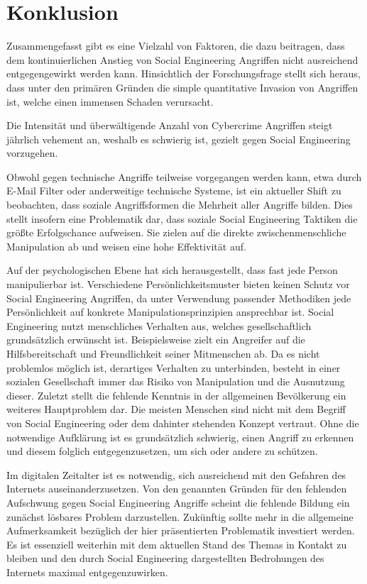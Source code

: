 \chapter{Konklusion}
\label{chapter:konklusion}

Zusammengefasst gibt es eine Vielzahl von Faktoren, die dazu beitragen, dass dem kontinuierlichen Anstieg von Social Engineering Angriffen nicht ausreichend entgegengewirkt werden kann.
Hinsichtlich der Forschungsfrage stellt sich heraus, dass unter den primären Gründen die simple quantitative Invasion von Angriffen ist, welche einen immensen Schaden verursacht.

Die Intensität und überwältigende Anzahl von Cybercrime Angriffen steigt jährlich vehement an, weshalb es schwierig ist, gezielt gegen Social Engineering vorzugehen.

Obwohl gegen technische Angriffe teilweise vorgegangen werden kann, etwa durch E-Mail Filter oder anderweitige technische Systeme, ist ein aktueller Shift zu beobachten,
dass soziale Angriffsformen die Mehrheit aller Angriffe bilden. Dies stellt insofern eine Problematik dar, dass soziale Social Engineering Taktiken die größte Erfolgschance aufweisen.
Sie zielen auf die direkte zwischenmenschliche Manipulation ab und weisen eine hohe Effektivität auf.

Auf der psychologischen Ebene hat sich herausgestellt, dass fast jede Person manipulierbar ist. Verschiedene Persönlichkeitsmuster bieten keinen Schutz vor Social Engineering Angriffen, da unter Verwendung
passender Methodiken jede Persönlichkeit auf konkrete Manipulationsprinzipien ansprechbar ist.
Social Engineering nutzt menschliches Verhalten aus, welches gesellschaftlich grundsätzlich erwünscht ist.
Beispielsweise zielt ein Angreifer auf die Hilfsbereitschaft und Freundlichkeit seiner Mitmenschen ab.
Da es nicht problemlos möglich ist, derartiges Verhalten zu unterbinden, besteht in einer sozialen Gesellschaft immer das Risiko von Manipulation und die Ausnutzung dieser.
\newpage
Zuletzt stellt die fehlende Kenntnis in der allgemeinen Bevölkerung ein weiteres Hauptproblem dar.
Die meisten Menschen sind nicht mit dem Begriff von Social Engineering oder dem dahinter stehenden Konzept vertraut.
Ohne die notwendige Aufklärung ist es grundsätzlich schwierig, einen Angriff zu erkennen und diesem folglich entgegenzusetzen, um sich oder andere zu schützen.

Im digitalen Zeitalter ist es notwendig, sich ausreichend mit den Gefahren des Internets auseinanderzusetzen.
Von den genannten Gründen für den fehlenden Aufschwung gegen Social Engineering Angriffe scheint die fehlende Bildung ein zunächst lösbares Problem darzustellen.
Zukünftig sollte mehr in die allgemeine Aufmerksamkeit bezüglich der hier präsentierten Problematik investiert werden.
Es ist essenziell weiterhin mit dem aktuellen Stand des Themas in Kontakt zu bleiben und den durch Social Engineering dargestellten Bedrohungen des Internets maximal entgegenzuwirken.
